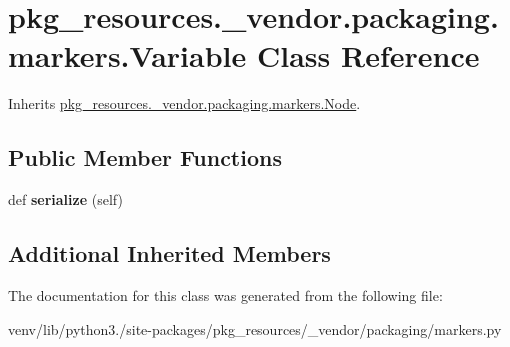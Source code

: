 \hypertarget{classpkg__resources_1_1__vendor_1_1packaging_1_1markers_1_1_variable}{}\section{pkg\+\_\+resources.\+\_\+vendor.\+packaging.\+markers.\+Variable Class Reference}
\label{classpkg__resources_1_1__vendor_1_1packaging_1_1markers_1_1_variable}


Inherits \hyperlink{classpkg__resources_1_1__vendor_1_1packaging_1_1markers_1_1_node}{pkg\+\_\+resources.\+\_\+vendor.\+packaging.\+markers.\+Node}.

\subsection*{Public Member Functions}
\begin{DoxyCompactItemize}
\item 
\mbox{\label{classpkg__resources_1_1__vendor_1_1packaging_1_1markers_1_1_variable_adf41d0e0f84f364d38fc11787426fcc6}} 
def {\bfseries serialize} (self)
\end{DoxyCompactItemize}
\subsection*{Additional Inherited Members}


The documentation for this class was generated from the following file\+:\begin{DoxyCompactItemize}
\item 
venv/lib/python3./site-\/packages/pkg\+\_\+resources/\+\_\+vendor/packaging/markers.\+py\end{DoxyCompactItemize}
